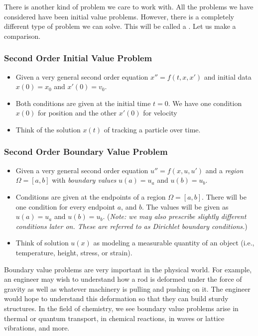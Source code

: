         
There is another kind of problem we care to work with.  All the problems we have considered have been initial value problems. However, there is a completely different type of problem we can solve.  This will be called a .  Let us make a comparison.

\subsubsection{Second Order Initial Value Problem}
\begin{itemize}
    \item Given a very general second order equation $x''=f(t,x,x')$ and initial data $x(0)=x_0$ and $x'(0)=v_0$.  
    \item Both conditions are given at the initial time $t=0$. We have one condition $x(0)$ for position and the other $x'(0)$ for velocity 
    \item Think of the solution $x(t)$ of tracking a particle over time. 
\end{itemize}

\subsubsection{Second Order Boundary Value Problem}
\begin{itemize}
    \item Given a very general second order equation $u''=f(x,u,u')$ and a \emph{region} $\Omega=[a,b]$ with \emph{boundary values} $u(a)=u_a$ and $u(b)=u_b$.
    \item Conditions are given at the endpoints of a region $\Omega=[a,b]$.  There will be one condition for every endpoint $a$, and $b$. The values will be given as $u(a)=u_a$ and $u(b)=u_b$. (\emph{Note: we may also prescribe slightly different conditions later on. These are referred to as Dirichlet boundary conditions.})
    \item Think of solution $u(x)$ as modeling a measurable quantity of an object (i.e., temperature, height, stress, or strain).
\end{itemize}

Boundary value problems are very important in the physical world.  For example, an engineer may wish to understand how a rod is deformed under the force of gravity as well as whatever machinery is pulling and pushing on it.  The engineer would hope to understand this deformation so that they can build sturdy structures.  In the field of chemistry, we see boundary value problems arise in thermal or quantum transport, in chemical reactions, in waves or lattice vibrations, and more. 

